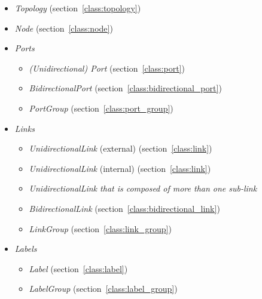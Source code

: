 \begin{itemize}

    \item \emph{Topology} (section~\ref{class:topology})
      
    \item \emph{Node} (section~\ref{class:node})
      
    \item \emph{Ports}  
      \begin{itemize}
        \item \emph{(Unidirectional) Port}  (section~\ref{class:port})
          
        \item \emph{BidirectionalPort} (section~\ref{class:bidirectional_port})
          
        \item \emph{PortGroup} (section~\ref{class:port_group})
          
      \end{itemize}
    \item \emph{Links} 
      \begin{itemize}
        \item \emph{UnidirectionalLink} (external) (section~\ref{class:link})
          
        \item \emph{UnidirectionalLink} (internal) (section~\ref{class:link})
          
        \item \emph{UnidirectionalLink that is composed of more than one sub-link}
          
        \item \emph{BidirectionalLink} (section~\ref{class:bidirectional_link})
          
        \item \emph{LinkGroup} (section~\ref{class:link_group})
          
      \end{itemize}
    \item \emph{Labels}
      \begin{itemize}
        \item \emph{Label} (section~\ref{class:label})
          
        \item \emph{LabelGroup} (section~\ref{class:label_group})
          
      \end{itemize}

\end{itemize}
